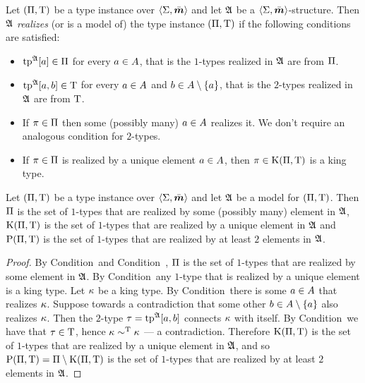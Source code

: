 \begin{definition}
Let $(\Pi,\mathrm{T})$ be a type instance over $\left\langle \mathrm{\Sigma},\bar{\bm{m}} \right\rangle$ and let
$\mathfrak{A}$ be a $\left\langle \mathrm{\Sigma},\bar{\bm{m}} \right\rangle$-structure.
Then $\mathfrak{A}$ \emph{realizes} (or is a model of) the type instance
$(\Pi,\mathrm{T})$ if the following conditions are satisfied:
\begin{itemize}
  \item[\condrealizI]\label{cond:realizI}
  $\operatorname{tp}^{\mathfrak{A}}[a] \in \Pi$ for every $a\in A$, that is the $1$-types
  realized in $\mathfrak{A}$ are from $\Pi$.
  \item[\condrealizII]\label{cond:realizII}
  $\operatorname{tp}^{\mathfrak{A}}[a,b] \in \mathrm{T}$ for every $a\in A$
  and $b \in A\setminus\left\{a\right\}$, that is the $2$-types realized in $\mathfrak{A}$
  are from $\mathrm{T}$.
  \item[\condrealizp]\label{cond:realizp}
  If $\pi \in \Pi$ then some (possibly many) $a \in A$ realizes it.
  We don't require an analogous condition for $2$-types.
  \item[\condrealizk]\label{cond:realizk}
  If $\pi \in \Pi$ is realized by a unique element $a \in A$, then
  $\pi \in \mathrm{K}(\Pi,\mathrm{T})$ is a king type.
\end{itemize}
\end{definition}
\begin{remark}\label{rem:tpi-char}
Let $(\Pi,\mathrm{T})$ be a type instance over $\left\langle \mathrm{\Sigma},\bar{\bm{m}} \right\rangle$ and let $\mathfrak{A}$
be a model for $(\Pi,\mathrm{T})$.
Then $\Pi$ is the set of $1$-types that are realized by some (possibly many)
element in $\mathfrak{A}$, $\mathrm{K}(\Pi,\mathrm{T})$ is the set of $1$-types that are realized by a unique
element in $\mathfrak{A}$ and $\mathrm{P}(\Pi,\mathrm{T})$ is the set of $1$-types that are
realized by at least $2$ elements in $\mathfrak{A}$.
\end{remark}
\begin{proof}
By Condition~ and Condition~, $\Pi$ is the set
of $1$-types that are realized by some element in $\mathfrak{A}$.
By Condition~ any $1$-type that is realized by a unique element
is a king type. Let $\kappa$ be a king type. By Condition~ there
is some $a \in A$ that realizes $\kappa$. Suppose towards a contradiction
that some other $b \in A \setminus \left\{a\right\}$ also realizes $\kappa$. Then the
$2$-type $\tau = \operatorname{tp}^{\mathfrak{A}}[a,b]$ connects $\kappa$ with itself.
By Condition~ we have that $\tau \in \mathrm{T}$, hence $\kappa
\sim^{\mathrm{T}} \kappa$ --- a contradiction. Therefore $\mathrm{K}(\Pi,\mathrm{T})$ is the set of
$1$-types that are realized by a unique element in $\mathfrak{A}$, and so
$\mathrm{P}(\Pi,\mathrm{T}) = \Pi \setminus \mathrm{K}(\Pi,\mathrm{T})$ is the set of $1$-types that are
realized by at least $2$ elements in $\mathfrak{A}$.
\end{proof}

